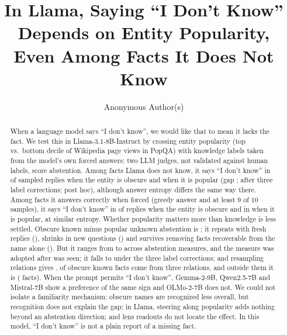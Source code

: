 \documentclass[manuscript,screen,review,anonymous,nonacm]{acmart}
\newcommand{\idk}{``I don't know''}
\begin{document}
\title{In Llama, Saying ``I Don't Know'' Depends on Entity Popularity, Even Among Facts It Does Not Know}
\author{Anonymous Author(s)}

\begin{abstract}
When a language model says \idk, we would like that to mean it lacks the fact. We test this in Llama-3.1-8B-Instruct by crossing entity popularity (top vs.\ bottom decile of Wikipedia page views in PopQA) with knowledge labels taken from the model's own forced answers; two LLM judges, not validated against human labels, score abstention. Among facts Llama does not know, it says \idk{} in \tcObsUnkAbs{} of sampled replies when the entity is obscure and \tcPopUnkAbs{} when it is popular (gap \rcUnk{} \rcUnkCI; \rcUnkJoint{} \rcUnkJointCI{} after three label corrections; post hoc), although answer entropy differs the same way there. Among facts it answers correctly when forced (greedy answer and at least 9 of 10 samples), it says \idk{} in \tcObsKnownAbs{} of replies when the entity is obscure and in \cPopKnownAbs{} when it is popular, at similar entropy. Whether popularity matters more than knowledge is less settled. Obscure known minus popular unknown abstention is \hmLlamaDiff{} \hmLlamaDiffCI; it repeats with fresh replies (\frDiff), shrinks in new questions (\nqDiff) and survives removing facts recoverable from the name alone (\ncDiff). But it ranges from \hjLlamaDiff{} to \faLlamaRegexDiff{} across abstention measures, and the \hmLlamaDiff{} measure was adopted after \hjLlamaDiff{} was seen; it falls to \rcJoint{} \rcJointCI{} under the three label corrections; and resampling relations gives \rcClusCI. \rcTopThree{} of \gsObsKnownTotal{} obscure known facts come from three relations, and outside them it is \msOutDiff{} (\msOutKnownN{} facts). When the prompt permits \idk, Gemma-2-9B, Qwen2.5-7B and Mistral-7B show a preference of the same sign and OLMo-2-7B does not. We could not isolate a familiarity mechanism: obscure names are recognized less overall, but recognition does not explain the gap; in Llama, steering along popularity adds nothing beyond an abstention direction; and lens readouts do not locate the effect. In this model, \idk{} is not a plain report of a missing fact.
\end{abstract}


\maketitle
\end{document}
